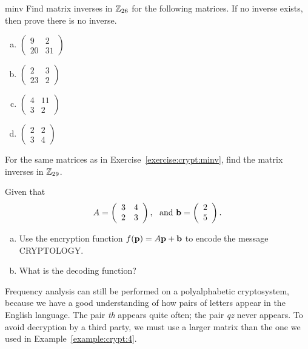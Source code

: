 \begin{exercise}{minv}
Find matrix inverses in ${\Bbb Z}_{26}$ for the following matrices. If no inverse exists, then prove there is no inverse.
\begin{multicols}{2}
\begin{enumerate}[(a)]
\item
$\left( \begin{array}{cc} 9 & 2 \\ 20 & 31 \end{array} \right)$
\item
$\left( \begin{array}{cc} 2 & 3 \\ 23 & 2 \end{array} \right)$
\item
$\left( \begin{array}{cc} 4 & 11 \\ 3 & 2 \end{array} \right)$
\item
$\left( \begin{array}{cc} 2 & 2 \\ 3 & 4 \end{array} \right)$
\end{enumerate}
\end{multicols}
\end{exercise}
 \begin{exercise}{}
For the same matrices as in Exercise~\ref{exercise:crypt:minv}, find the matrix inverses in ${\Bbb Z}_{29}$.
\end{exercise}

\begin{exercise}{}
Given that
$$
A =
\left(
\begin{array}{cc}
3 & 4 \\
2 & 3
\end{array}
\right),~~ \text{and~} {\bold b} = \left( \begin{array}{c} 2 \\ 5 \end{array}\right).$$
\begin{enumerate}[(a)]
\item
Use the encryption function $f({\bold p}) = A {\bold p} + {\bold b}$
to encode the message CRYPTOLOGY.  
\item
What is the decoding function?  
\end{enumerate}
 \end{exercise}
 
Frequency analysis can still be performed on a polyalphabetic
cryptosystem, because we have a good understanding of how pairs of
letters appear in the English language. The pair {\em th} appears
quite often; the pair {\em qz} never appears.  To avoid decryption by
a third party, we must use a larger matrix than the one we used in
Example~\ref{example:crypt:4}. 
  
